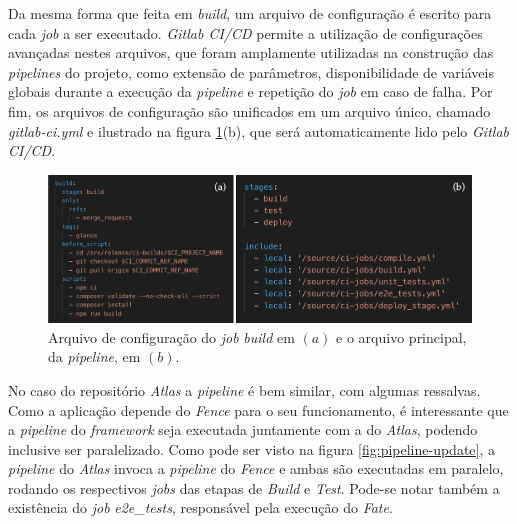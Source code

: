 Da mesma forma que feita em \emph{build}, um arquivo de configuração é escrito para cada \emph{job} a ser executado. \emph{Gitlab CI/CD} permite a utilização de configurações avançadas nestes arquivos, que foram amplamente utilizadas na construção das \emph{pipelines} do projeto, como extensão de parâmetros, disponibilidade de variáveis globais durante a execução da \emph{pipeline} e repetição do \emph{job} em caso de falha. Por fim, os arquivos de configuração são unificados em um arquivo único, chamado \emph{gitlab-ci.yml} e ilustrado na figura \ref{fig:pipeline-2}(b), que será automaticamente lido pelo \emph{Gitlab CI/CD}.

\begin{figure}[H]
    \centering
    \includegraphics[width=15cm]{source/4-solucao/images/pipeline-2.png}
    \caption{Arquivo de configuração do \emph{job} \emph{build} em $(a)$ e o arquivo principal, da \emph{pipeline}, em $(b)$.}
    \label{fig:pipeline-2}
\end{figure}

No caso do repositório \emph{Atlas} a \emph{pipeline} é bem similar, com algumas ressalvas. Como a aplicação depende do \emph{Fence} para o seu funcionamento, é interessante que a \emph{pipeline} do \emph{framework} seja executada juntamente com a do \emph{Atlas}, podendo inclusive ser paralelizado. Como pode ser visto na figura \ref{fig:pipeline-update}, a \emph{pipeline} do \emph{Atlas} invoca a \emph{pipeline} do \emph{Fence} e ambas são executadas em paralelo, rodando os respectivos \emph{jobs} das etapas de \emph{Build} e \emph{Test}. Pode-se notar também a existência do \emph{job} \emph{e2e\_tests}, responsável pela execução do \emph{Fate}.

